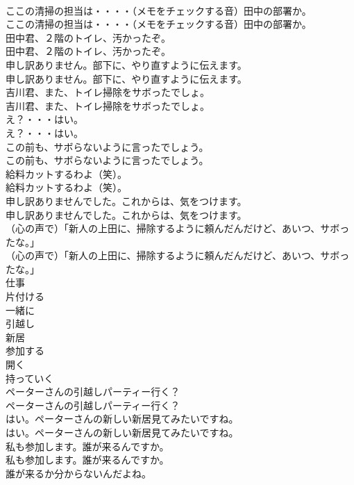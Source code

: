 \documentclass[8pt]{extreport}
\begin{document}
\begin{CJK}{UTF8}{min}
\\	ここの清掃の担当は・・・・（メモをチェックする音）田中の部署か。	
\\	ここの清掃の担当は・・・・（メモをチェックする音）田中の部署か。 
\\	田中君、２階のトイレ、汚かったぞ。	
\\	田中君、２階のトイレ、汚かったぞ。 
\\	申し訳ありません。部下に、やり直すように伝えます。	
\\	申し訳ありません。部下に、やり直すように伝えます。 
\\	吉川君、また、トイレ掃除をサボったでしょ。	
\\	吉川君、また、トイレ掃除をサボったでしょ。 
\\	え？・・・はい。	
\\	え？・・・はい。 
\\	この前も、サボらないように言ったでしょう。	
\\	この前も、サボらないように言ったでしょう。 
\\	給料カットするわよ（笑）。	
\\	給料カットするわよ（笑）。 
\\	申し訳ありませんでした。これからは、気をつけます。	
\\	申し訳ありませんでした。これからは、気をつけます。 
\\	（心の声で）「新人の上田に、掃除するように頼んだんだけど、あいつ、サボったな。」	
\\	（心の声で）「新人の上田に、掃除するように頼んだんだけど、あいつ、サボったな。」 
\\	仕事
\\	片付ける
\\	一緒に
\\	引越し
\\	新居
\\	参加する
\\	開く
\\	持っていく
\\	ペーターさんの引越しパーティー行く？	
\\	ペーターさんの引越しパーティー行く？ 
\\	はい。ペーターさんの新しい新居見てみたいですね。	
\\	はい。ペーターさんの新しい新居見てみたいですね。 
\\	私も参加します。誰が来るんですか。	
\\	私も参加します。誰が来るんですか。 
\\	誰が来るか分からないんだよね。	

\end{CJK}
\end{document}
